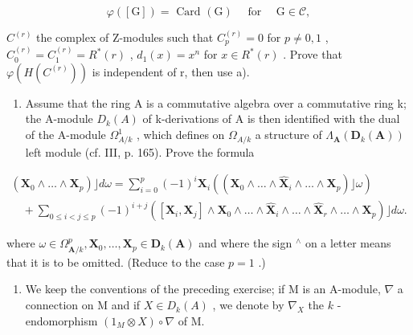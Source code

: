 \[
\varphi ([ \mathrm{G} ]) = \text { Card } (\mathrm{G}) \quad \text { for } \quad \mathrm{G} \in \mathscr {C},
\]

\(C^{(r)}\) the complex of Z-modules such that \(C_{p}^{(r)} = 0\) for \(p \neq 0, 1\) , \(C_{0}^{(r)} = C_{1}^{(r)} = R^{*}(r)\) , \(d_{1}(x) = x^{n}\) for \(x \in R^{*}(r)\) . Prove that \(\varphi(H(C^{(r)}))\) is independent of r, then use a).

\begin{enumerate}
\def\labelenumi{\arabic{enumi})}
\setcounter{enumi}{20}
\tightlist
\item
  Assume that the ring A is a commutative algebra over a commutative ring k; the A-module \(D_{k}(A)\) of k-derivations of A is then identified with the dual of the A-module \(\Omega_{A/k}^{1}\) , which defines on \(\Omega_{A/k}\) a structure of \(\Lambda_{\mathbf{A}}(\mathbf{D}_{k}(\mathbf{A}))\) left module (cf. III, p. 165). Prove the formula
\end{enumerate}

\[
\begin{array}{l} \left(\mathbf {X} _ {0} \wedge \dots \wedge \mathbf {X} _ {p}\right) \rfloor d \omega = \sum_ {i = 0} ^ {p} (- 1) ^ {i} \mathbf {X} _ {i} \left(\left(\mathbf {X} _ {0} \wedge \dots \wedge \hat {\mathbf {X}} _ {i} \wedge \dots \wedge \mathbf {X} _ {p}\right) \rfloor \omega\right) \\ \quad + \sum_ {0 \leqslant i <   j \leqslant p} (- 1) ^ {i + j} \left([ \mathbf {X} _ {i}, \mathbf {X} _ {j} ] \wedge \mathbf {X} _ {0} \wedge \dots \wedge \hat {\mathbf {X}} _ {i} \wedge \dots \wedge \hat {\mathbf {X}} _ {r} \wedge \dots \wedge \mathbf {X} _ {p}\right) \rfloor d \omega . \end{array}
\]

where \(\omega\in\Omega_{\mathbf{A}/k}^{p},\mathbf{X}_{0},\ldots,\mathbf{X}_{p}\in\mathbf{D}_{k}(\mathbf{A})\) and where the sign \(^{\wedge}\) on a letter means that it is to be omitted. (Reduce to the case \(p=1\) .)

\begin{enumerate}
\def\labelenumi{\arabic{enumi})}
\setcounter{enumi}{21}
\tightlist
\item
  We keep the conventions of the preceding exercise; if M is an A-module, \(\nabla\) a connection on M and if \(X \in D_k(A)\) , we denote by \(\nabla_X\) the \(k\) -endomorphism \((1_M \otimes X) \circ \nabla\) of M.
\end{enumerate}

